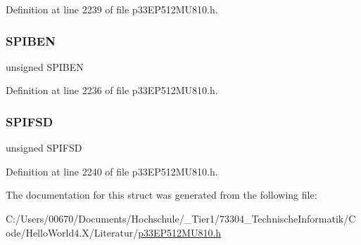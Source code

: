 Definition at line 2239 of file p33\+E\+P512\+M\+U810.\+h.

\mbox{\label{structtag_s_p_i3_c_o_n2_b_i_t_s_a48f1b49d7589da2ee8c38cd6d820a542}} 
\subsubsection{\texorpdfstring{S\+P\+I\+B\+EN}{SPIBEN}}
{\footnotesize\ttfamily unsigned S\+P\+I\+B\+EN}



Definition at line 2236 of file p33\+E\+P512\+M\+U810.\+h.

\mbox{\label{structtag_s_p_i3_c_o_n2_b_i_t_s_aeb3b552a9f7c25bc1ae09655904e34cc}} 
\subsubsection{\texorpdfstring{S\+P\+I\+F\+SD}{SPIFSD}}
{\footnotesize\ttfamily unsigned S\+P\+I\+F\+SD}



Definition at line 2240 of file p33\+E\+P512\+M\+U810.\+h.



The documentation for this struct was generated from the following file\+:\begin{DoxyCompactItemize}
\item 
C\+:/\+Users/00670/\+Documents/\+Hochschule/\+\_\+\+Tier1/73304\+\_\+\+Technische\+Informatik/\+Code/\+Hello\+World4.\+X/\+Literatur/\hyperlink{p33_e_p512_m_u810_8h}{p33\+E\+P512\+M\+U810.\+h}\end{DoxyCompactItemize}
